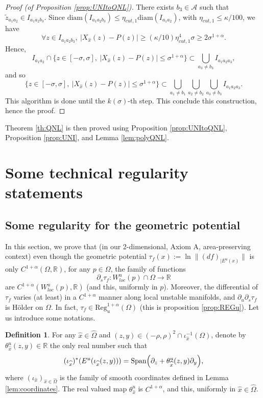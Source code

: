\documentclass[a4paper]{article}
\theoremstyle{definition}
\newtheorem{definition}{Definition}[section]
\begin{document}
\begin{proof}[Proof (of Proposition \ref{prop:UNItoQNL})]
There exists $b_3 \in \mathcal{A}$ such that $\tilde{z}_{a_1 a_2} \in I_{a_1 a_2 b_3}$. Since $\text{diam}(I_{a_1 a_2 b_3}) \leq \eta_{cut,1} \text{diam}(I_{a_1 a_2})$, with $\eta_{cut,1} \leq \kappa/100$, we have
$$ \forall z \in I_{a_1 a_2 b_3}, \ |X_{\widehat{x}}(z) - P(z)| \geq (\kappa/10) \eta_{cut,1}^4 \sigma \geq 2 \sigma^{1+\alpha} .$$
Hence,
$$ I_{a_1 a_2} \cap \{ z \in [-\sigma,\sigma], \ |X_{\widehat{x}}(z) - P(z)| \leq \sigma^{1+\alpha} \} \subset \bigcup_{a_3 \neq b_3} I_{a_1 a_2 a_3} ,$$
and so $$ \{ z \in [-\sigma,\sigma], \ |X_{\widehat{x}}(z) - P(z)| \leq \sigma^{1+\alpha} \} \subset \bigcup_{a_1 \neq b_1}  \bigcup_{a_2 \neq b_2}   \bigcup_{a_3 \neq b_3}  I_{a_1 a_2 a_3} .$$
This algorithm is done until the $k(\sigma)$-th step. This conclude this construction, hence the proof. \end{proof}

Theorem \ref{th:QNL} is then proved using Proposition \ref{prop:UNItoQNL}, Proposition \ref{prop:UNI}, and Lemma \ref{lem:polyQNL}.




\appendix

\section{Some technical regularity statements}\label{ap:A}


\subsection{Some regularity for the geometric potential}

In this section, we prove that (in our 2-dimensional, Axiom A, area-preserving context) even though the geometric potential $\tau_f(x) := \ln \| (df)_{|E^u(x)} \|$ is only $C^{1+\alpha}(\Omega,\mathbb{R})$,  for any $p \in \Omega$, the family of functions 
$$ \partial_s \tau_f : W^u_{loc}(p) \cap \Omega \longrightarrow \mathbb{R} $$
are $C^{1+\alpha}(W^u_{loc}(p),\mathbb{R})$ (and this, uniformly in $p$). Moreover, the differential of $\tau_f$ varies (at least) in a $C^{1+\alpha}$ manner along local unstable manifolds, and $\partial_u \partial_s \tau_f$ is Hölder on $\Omega$. In fact, $\tau_f \in \text{Reg}_u^{1+\alpha}(\Omega)$ (this is proposition \ref{prop:REGu}). Let us introduce some notations.

\begin{definition}
For any $\widehat{x} \in \widehat{\Omega}$ and $(z,y) \in (-\rho,\rho)^2 \cap \iota_{\widehat{x}}^{-1}(\Omega)$, denote by $\theta^u_{\widehat{x}}(z,y) \in \mathbb{R}$ the only real number such that
$$ (\iota_{\widehat{x}})^*(E^u(\iota_{\widehat{x}}(z,y))) = \text{Span}\Big{(}\partial_z + \theta^u_{\widehat{x}}(z,y) \partial_y\Big{)} ,$$
where $(\iota_{\widehat{x}})_{{\widehat{x}} \in \widehat{\Omega}}$ is the family of smooth coordinates defined in Lemma \ref{lem:coordinates}. 
The real valued map $\theta_{\widehat{x}}^u$ is $C^{1+\alpha}$, and this, uniformly in ${\widehat{x}} \in \widehat{\Omega}$.
\end{definition}
\end{document}
